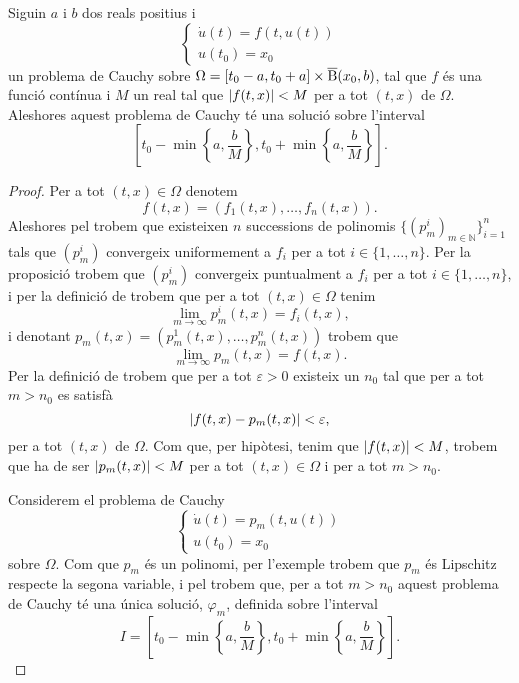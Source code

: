 \documentclass[../Apunts.tex]{subfiles}
\begin{document}
	\begin{theorem}
		\label{thm:Teorema de Peano}
		Siguin \(a\) i \(b\) dos reals positius i
		\begin{equation}
			\label{thm:Teorema de Peano:eq3}
			\begin{cases}
				\displaystyle\dot{u}(t)=f(t,u(t)) \\
				\displaystyle u(t_{0})=x_{0}
			\end{cases}
		\end{equation}
		un problema de Cauchy sobre \(\Omega=[t_{0}-a,t_{0}+a]\times\overline{\operatorname{B}}(x_{0},b)\), tal que \(f\) és una funció contínua i \(M\) un real tal que \(\norm{f(t,x)}<M\) per a tot \((t,x)\) de \(\Omega\).
		Aleshores aquest problema de Cauchy té una solució sobre l'interval
		\[\left[t_{0}-\min\left\{a,\frac{b}{M}\right\},t_{0}+\min\left\{a,\frac{b}{M}\right\}\right].\]
		\begin{proof} %
			Per a tot \((t,x)\in\Omega\) denotem
			\[f(t,x)=(f_{1}(t,x),\dots,f_{n}(t,x)).\]
			Aleshores pel  trobem que existeixen \(n\) successions de polinomis \(\{(p_{m}^{i})_{m\in\mathbb{N}}\}_{i=1}^{n}\) tals que \((p_{m}^{i})\) convergeix uniformement a \(f_{i}\) per a tot \(i\in\{1,\dots,n\}\). Per la proposició  trobem que \((p_{m}^{i})\) convergeix puntualment a \(f_{i}\) per a tot \(i\in\{1,\dots,n\}\), i per la definició de  trobem que per a tot \((t,x)\in\Omega\) tenim
			\[\lim_{m\to\infty}p_{m}^{i}(t,x)=f_{i}(t,x),\]
			i denotant \(p_{m}(t,x)=(p_{m}^{1}(t,x),\dots,p_{m}^{n}(t,x))\) trobem que
			\begin{equation}
				\label{thm:Teorema de Peano:eq2}
				\lim_{m\to\infty}p_{m}(t,x)=f(t,x).
			\end{equation}
			Per la definició de  trobem que per a tot \(\varepsilon>0\) existeix un \(n_{0}\) tal que per a tot \(m>n_{0}\) es satisfà
			\[\norm{f(t,x)-p_{m}(t,x)}<\varepsilon,\]
			per a tot \((t,x)\) de \(\Omega\). Com que, per hipòtesi, tenim que \(\norm{f(t,x)}<M\), trobem que ha de ser \(\norm{p_{m}(t,x)}<M\) per a tot \((t,x)\in\Omega\) i per a tot \(m>n_{0}\).
			
			Considerem el problema de Cauchy
			\[\begin{cases}
				\displaystyle\dot{u}(t)=p_{m}(t,u(t)) \\
				\displaystyle u(t_{0})=x_{0}
			\end{cases}\] %
			sobre \(\Omega\). Com que \(p_{m}\) és un polinomi, per l'exemple  trobem que \(p_{m}\) és Lipschitz respecte la segona variable, i pel  trobem que, per a tot \(m>n_{0}\) aquest problema de Cauchy té una única solució, \(\varphi_{m}\), definida sobre l'interval
			\[I=\left[t_{0}-\min\left\{a,\frac{b}{M}\right\},t_{0}+\min\left\{a,\frac{b}{M}\right\}\right].\]
			

\end{proof}
\end{theorem}
\end{document}
